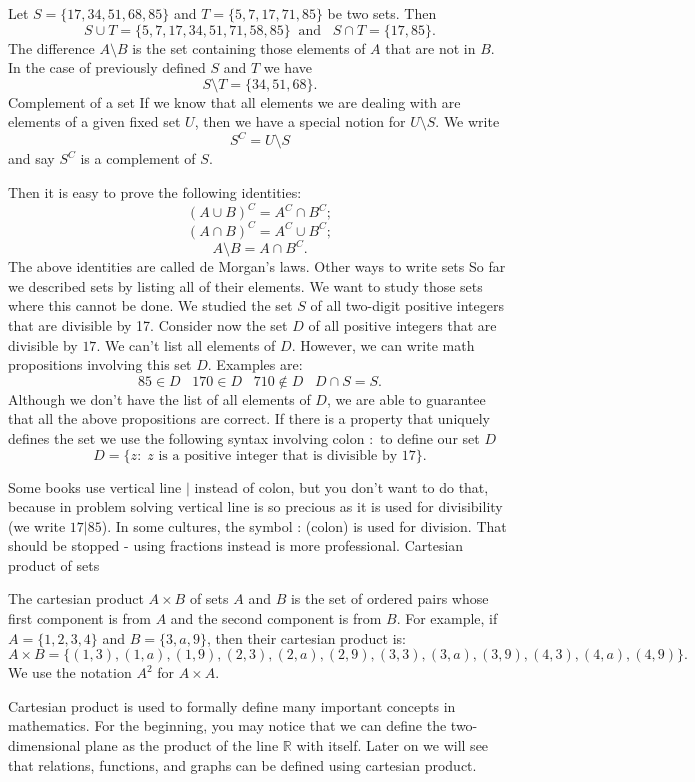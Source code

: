 \documentclass[11pt]{article}
\theoremstyle{definition}
\theoremstyle{plain}
\begin{document}
Let \( S=\{17,34,51,68,85\} \) and \( T=\{5, 7, 17, 71, 85\} \) be two sets. Then
\[ S\cup T=\{5,7,17,34,51,71,58,85\}\;\;\mbox{and}\;\;\; S\cap T=\{17,85\}.\]
The difference \( A\setminus B \) is the set containing those elements of \( A \) that are not in \( B \). In the case of previously defined \( S \) and \( T \) we have \[ S\setminus T=\{34,51,68\}.\]
Complement of a set
If we know that all elements we are dealing with are elements of a given fixed set \( U \), then we have a special notion for \( U\setminus S \). We write \[ S^C=U\setminus S\] and say \( S^C \) is a complement of \( S \).

Then it is easy to prove the following identities: \[ (A\cup B)^C=A^C\cap B^C;\] \[ (A\cap B)^C=A^C\cup B^C;\] \[ A\setminus B=A\cap B^C.\] The above identities are called de Morgan's laws.
Other ways to write sets
So far we described sets by listing all of their elements. We want to study those sets where this cannot be done. We studied the set \( S \) of all two-digit positive integers that are divisible by 17. Consider now the set \( D \) of all positive integers that are divisible by \( 17 \). We can't list all elements of \( D \). However, we can write math propositions involving this set \( D \). Examples are: \[ 85\in D\;\;\; 170\in D\;\;\; 710\not\in D\;\;\; D\cap S=S.\] Although we don't have the list of all elements of \( D \), we are able to guarantee that all the above propositions are correct. If there is a property that uniquely defines the set we use the following syntax involving colon \( : \) to define our set \( D \) \[ D=\{z: \;z\mbox{ is a positive integer that is divisible by }17\}.\]

Some books use vertical line \( | \) instead of colon, but you don't want to do that, because in problem solving vertical line is so precious as it is used for divisibility (we write \( 17|85 \)). In some cultures, the symbol : (colon) is used for division. That should be stopped - using fractions instead is more professional.
Cartesian product of sets

The cartesian product \( A\times B \) of sets \( A \) and \( B \) is the set of ordered pairs whose first component is from \( A \) and the second component is from \( B \). For example, if \( A=\{1,2,3,4\} \) and \( B=\{3, a, 9\} \), then their cartesian product is: \[ A\times B=\{(1,3), (1, a), (1,9), (2,3), (2,a), (2,9), (3,3), (3,a), (3,9), (4,3), (4,a), (4,9)\}.\] We use the notation \( A^2 \) for \( A\times A \).

Cartesian product is used to formally define many important concepts in mathematics. For the beginning, you may notice that we can define the two-dimensional plane as the product of the line \( \mathbb R \) with itself. Later on we will see that relations, functions, and graphs can be defined using cartesian product.
\end{document}
